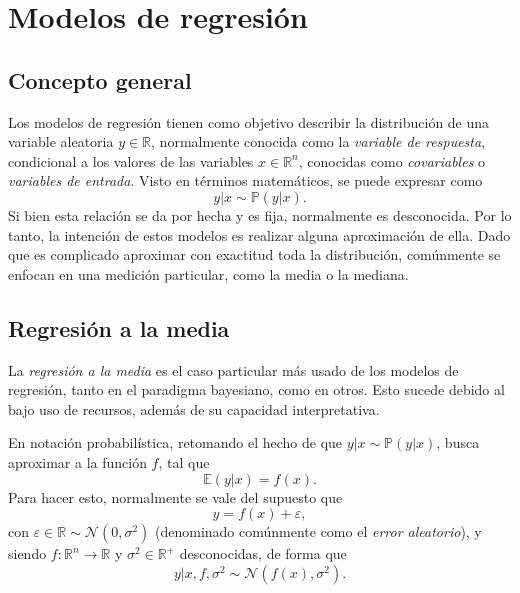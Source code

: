 \chapter[Modelos de regresi\'on]{Modelos de regresi\'on}

\section{Concepto general}

Los modelos de regresi\'on tienen como objetivo describir la distribuci\'on de una variable aleatoria $y \in \mathbb{R}$, normalmente conocida como la \textit{variable de respuesta}, condicional a los valores de las variables $x \in \mathbb{R}^n$, conocidas como \textit{covariables} o \textit{variables de entrada}. Visto en t\'erminos matem\'aticos, se puede expresar como
\begin{equation*}
    y|x \sim \mathbb{P}(y|x).
\end{equation*}
Si bien esta relaci\'on se da por hecha y es fija, normalmente es desconocida. Por lo tanto, la intenci\'on de estos modelos es realizar alguna aproximaci\'on de ella. Dado que es complicado aproximar con exactitud toda la distribuci\'on, com\'unmente se enfocan en una medici\'on particular, como la media o la mediana.

\section{Regresión a la media}

La \textit{regresi\'on a la media} es el caso particular m\'as usado de los modelos de regresi\'on, tanto en el paradigma bayesiano, como en otros. Esto sucede debido al bajo uso de recursos, adem\'as de su capacidad interpretativa.

En notaci\'on probabil\'istica, retomando el hecho de que $y|x \sim \mathbb{P}(y|x)$, busca aproximar a la funci\'on $f$, tal que 
\begin{equation*}
    \mathbb{E}(y|x) = f(x).
\end{equation*}
Para hacer esto, normalmente se vale del supuesto que
\begin{equation*}
    y = f(x) + \varepsilon,
\end{equation*}
con $\varepsilon \in \mathbb{R} \sim \mathcal{N}(0,\sigma^2)$ (denominado com\'unmente como el \textit{error aleatorio}), y siendo $f: \mathbb{R}^n \rightarrow \mathbb{R}$ y $\sigma^2 \in \mathbb{R^+}$ desconocidas, de forma que
\begin{equation*}
    y | x, f, \sigma^2 \sim \mathcal{N}(f(x),\sigma^2).
\end{equation*}

